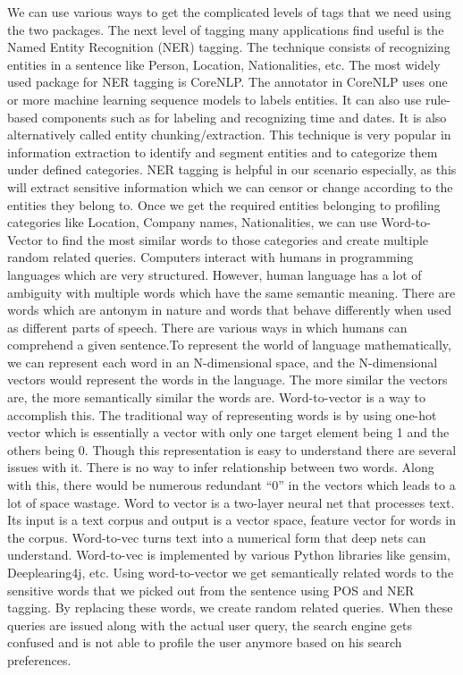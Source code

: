 \documentclass[10pt, a4paper, twocolumn]{article} %
\begin{document}
We can use various ways to get the complicated levels of tags that we need using the two packages. The next level of tagging many applications find useful is the Named Entity Recognition (NER) tagging. The technique consists of recognizing entities in a sentence like Person, Location, Nationalities, etc. The most widely used package for NER tagging is CoreNLP. The annotator in CoreNLP uses one or more machine learning sequence models to labels entities. It can also use rule-based components such as for labeling and recognizing time and dates. It is also alternatively called entity chunking/extraction. This technique is very popular in information extraction to identify and segment entities and to categorize them under defined categories. NER tagging is helpful in our scenario especially, as this will extract sensitive information which we can censor or change according to the entities they belong to. Once we get the required entities belonging to profiling categories like Location, Company names, Nationalities, we can use Word-to-Vector to find the most similar words to those categories and create multiple random related queries.\newline
Computers interact with humans in programming languages which are very structured. However, human language has a lot of ambiguity with multiple words which have the same semantic meaning.  There are words which are antonym in nature and words that behave differently when used as different parts of speech. There are various ways in which humans can comprehend a given sentence.To represent the world of language mathematically, we can represent each word in an N-dimensional space, and the N-dimensional vectors would represent the words in the language. The more similar the vectors are, the more semantically similar the words are.  Word-to-vector is a way to accomplish this. The traditional way of representing words is by using one-hot vector which is essentially a vector with only one target element being 1 and the others being 0. Though this representation is easy to understand there are several issues with it. There is no way to infer relationship between two words. Along with this, there would be numerous redundant “0” in the vectors which leads to a lot of space wastage.\newline
Word to vector is a two-layer neural net that processes text. Its input is a text corpus and output is a vector space, feature vector for words in the corpus. Word-to-vec turns text into a numerical form that deep nets can understand. Word-to-vec is implemented by various Python libraries like gensim, Deeplearing4j, etc. Using word-to-vector we get semantically related words to the sensitive words that we picked out from the sentence using POS and NER tagging. By replacing these words, we create random related queries. When these queries are issued along with the actual user query, the search engine gets confused and is not able to profile the user anymore based on his search preferences.\newline
\end{document}
